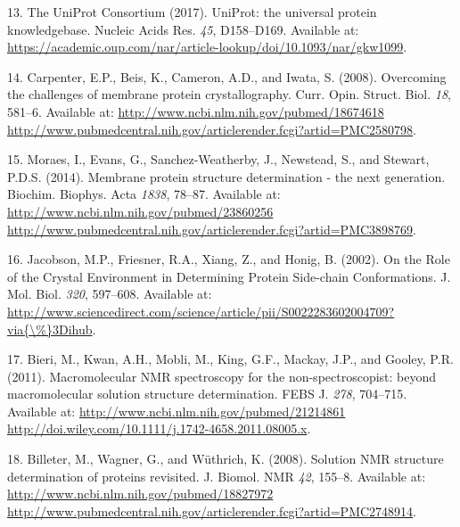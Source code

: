 \documentclass[11pt,a4paper,twoside]{book}
\theoremstyle{definition}
\theoremstyle{definition}
\theoremstyle{remark}
\begin{document}
\hypertarget{ref-TheUniProtConsortium2017}{}
13. The UniProt Consortium (2017). UniProt: the universal protein
knowledgebase. Nucleic Acids Res. \emph{45}, D158--D169. Available at:
\url{https://academic.oup.com/nar/article-lookup/doi/10.1093/nar/gkw1099}.

\hypertarget{ref-Carpenter2008}{}
14. Carpenter, E.P., Beis, K., Cameron, A.D., and Iwata, S. (2008).
Overcoming the challenges of membrane protein crystallography. Curr.
Opin. Struct. Biol. \emph{18}, 581--6. Available at:
\href{http://www.ncbi.nlm.nih.gov/pubmed/18674618\%20http://www.pubmedcentral.nih.gov/articlerender.fcgi?artid=PMC2580798}{http://www.ncbi.nlm.nih.gov/pubmed/18674618 http://www.pubmedcentral.nih.gov/articlerender.fcgi?artid=PMC2580798}.

\hypertarget{ref-Moraes2014}{}
15. Moraes, I., Evans, G., Sanchez-Weatherby, J., Newstead, S., and
Stewart, P.D.S. (2014). Membrane protein structure determination - the
next generation. Biochim. Biophys. Acta \emph{1838}, 78--87. Available
at:
\href{http://www.ncbi.nlm.nih.gov/pubmed/23860256\%20http://www.pubmedcentral.nih.gov/articlerender.fcgi?artid=PMC3898769}{http://www.ncbi.nlm.nih.gov/pubmed/23860256 http://www.pubmedcentral.nih.gov/articlerender.fcgi?artid=PMC3898769}.

\hypertarget{ref-Jacobson2002}{}
16. Jacobson, M.P., Friesner, R.A., Xiang, Z., and Honig, B. (2002). On
the Role of the Crystal Environment in Determining Protein Side-chain
Conformations. J. Mol. Biol. \emph{320}, 597--608. Available at:
\href{http://www.sciencedirect.com/science/article/pii/S0022283602004709?via\%7B/\%\%7D3Dihub}{http://www.sciencedirect.com/science/article/pii/S0022283602004709?via\{\textbackslash{}\%\}3Dihub}.

\hypertarget{ref-Bieri2011}{}
17. Bieri, M., Kwan, A.H., Mobli, M., King, G.F., Mackay, J.P., and
Gooley, P.R. (2011). Macromolecular NMR spectroscopy for the
non-spectroscopist: beyond macromolecular solution structure
determination. FEBS J. \emph{278}, 704--715. Available at:
\href{http://www.ncbi.nlm.nih.gov/pubmed/21214861\%20http://doi.wiley.com/10.1111/j.1742-4658.2011.08005.x}{http://www.ncbi.nlm.nih.gov/pubmed/21214861 http://doi.wiley.com/10.1111/j.1742-4658.2011.08005.x}.

\hypertarget{ref-Billeter2008}{}
18. Billeter, M., Wagner, G., and Wüthrich, K. (2008). Solution NMR
structure determination of proteins revisited. J. Biomol. NMR \emph{42},
155--8. Available at:
\href{http://www.ncbi.nlm.nih.gov/pubmed/18827972\%20http://www.pubmedcentral.nih.gov/articlerender.fcgi?artid=PMC2748914}{http://www.ncbi.nlm.nih.gov/pubmed/18827972 http://www.pubmedcentral.nih.gov/articlerender.fcgi?artid=PMC2748914}.
\end{document}
